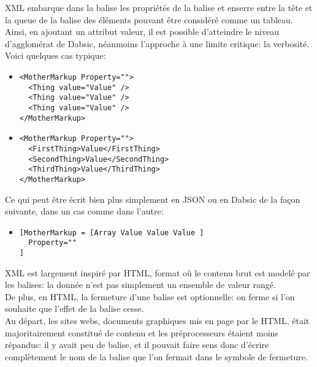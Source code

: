 \documentclass[a5paper, 12pt]{book}
\begin{document}
XML embarque dans la balise les propriétés de la balise et enserre entre
la tête et la queue de la balise des éléments pouvant être considéré comme
un tableau. Ainsi, en ajoutant un attribut valeur, il est possible d'atteindre
le niveau d'agglomérat de Dabsic, néanmoins l'approche à une limite
critique: la verbosité. Voici quelques cas typique:

\begin{itemize}
  \item
  \begin{verbatim}
<MotherMarkup Property="">
  <Thing value="Value" />
  <Thing value="Value" />
  <Thing value="Value" />
</MotherMarkup>
\end{verbatim}
	\vspace{\baselineskip}
  \item
  \begin{verbatim}
<MotherMarkup Property="">
  <FirstThing>Value</FirstThing>
  <SecondThing>Value</SecondThing>
  <ThirdThing>Value</ThirdThing>
</MotherMarkup>
\end{verbatim}
\vspace{\baselineskip}
\end{itemize}

Ce qui peut être écrit bien plus simplement en JSON ou en Dabsic
de la façon suivante, dans un cas comme dans l'autre:
\begin{itemize}
  \item
  \begin{verbatim}
[MotherMarkup = [Array Value Value Value ]
  Property=""
]
\end{verbatim}
\vspace{\baselineskip}
\end{itemize}

XML est largement inspiré par HTML, format où le contenu brut
est modelé par les balises: la donnée n'est pas simplement un
ensemble de valeur rangé.\\

De plus, en HTML, la fermeture d'une balise est optionnelle: on ferme
si l'on souhaite que l'effet de la balise cesse.\\

Au départ, les sites webs, documents graphiques mis en page
par le HTML, était majoritairement constitué de contenu et les
préprocesseurs étaient moins répandus: il y avait peu de balise,
et il pouvait faire sens donc d'écrire complètement le nom de
la balise que l'on fermait dans le symbole de fermeture.\\
\end{document}
